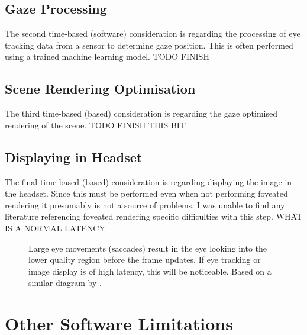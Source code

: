 \documentclass[a4paper,11pt]{article}
\begin{document}
\subsection{Gaze Processing}
The second time-based (software) consideration is regarding the processing of eye tracking data from a sensor to determine gaze position. This is often performed using a trained machine learning model. TODO FINISH

\subsection{Scene Rendering Optimisation}
The third time-based (based) consideration is regarding the gaze optimised rendering of the scene. TODO FINISH THIS BIT

\subsection{Displaying in Headset}
The final time-based (based) consideration is regarding displaying the image in the headset. Since this must be performed even when not performing foveated rendering it presumably is not a source of problems. I was unable to find any literature referencing foveated rendering specific difficulties with this step. WHAT IS A NORMAL LATENCY

\begin{figure}
  \begin{center}
    
    \caption{Large eye movements (saccades) result in the eye looking into the lower quality region before the frame updates. If eye tracking or image display is of high latency, this will be noticeable. Based on a similar diagram by \textcite{albert2017latency}.}
    \label{fig:eye}
  \end{center}
\end{figure}

\section{Other Software Limitations}
\end{document}
